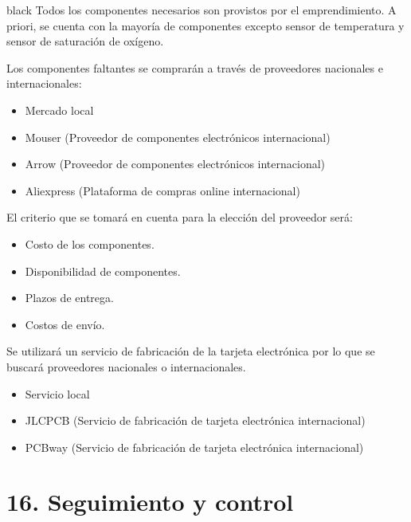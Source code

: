 \documentclass[11pt]{charter}
\begin{document}
\begin{consigna}{black}
Todos los componentes necesarios son provistos por el emprendimiento. A priori, se cuenta con la mayoría de componentes excepto sensor de temperatura y sensor de saturación de oxígeno.

Los componentes faltantes se comprarán a través de proveedores nacionales e internacionales:
\begin{itemize} 
\item Mercado local
\item Mouser (Proveedor de componentes electrónicos internacional)
\item Arrow (Proveedor de componentes electrónicos internacional)
\item Aliexpress (Plataforma de compras online internacional)
\end{itemize}

El criterio que se tomará en cuenta para la elección del proveedor será:
\begin{itemize} 
\item Costo de los componentes.
\item Disponibilidad de componentes.
\item Plazos de entrega.
\item Costos de envío.
\end{itemize}

Se utilizará un servicio de fabricación de la tarjeta electrónica por lo que se buscará proveedores nacionales o internacionales.
\begin{itemize} 
\item Servicio local 
\item JLCPCB (Servicio de fabricación de tarjeta electrónica internacional)
\item PCBway (Servicio de fabricación de tarjeta electrónica internacional)
\end{itemize}

\end{consigna}

\newpage
\section{16. Seguimiento y control}
\label{sec:seguimiento}
\end{document}
